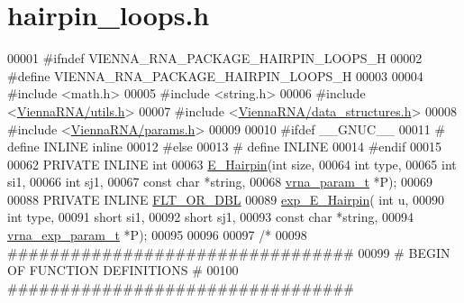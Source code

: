 \hypertarget{hairpin__loops_8h_source}{}\section{hairpin\+\_\+loops.\+h}
\label{hairpin__loops_8h_source}

\begin{DoxyCode}
00001 \textcolor{preprocessor}{#ifndef VIENNA\_RNA\_PACKAGE\_HAIRPIN\_LOOPS\_H}
00002 \textcolor{preprocessor}{#define VIENNA\_RNA\_PACKAGE\_HAIRPIN\_LOOPS\_H}
00003 
00004 \textcolor{preprocessor}{#include <math.h>}
00005 \textcolor{preprocessor}{#include <string.h>}
00006 \textcolor{preprocessor}{#include <\hyperlink{utils_8h}{ViennaRNA/utils.h}>}
00007 \textcolor{preprocessor}{#include <\hyperlink{data__structures_8h}{ViennaRNA/data\_structures.h}>}
00008 \textcolor{preprocessor}{#include <\hyperlink{params_8h}{ViennaRNA/params.h}>}
00009 
00010 \textcolor{preprocessor}{#ifdef \_\_GNUC\_\_}
00011 \textcolor{preprocessor}{# define INLINE inline}
00012 \textcolor{preprocessor}{#else}
00013 \textcolor{preprocessor}{# define INLINE}
00014 \textcolor{preprocessor}{#endif}
00015 
00062 PRIVATE INLINE \textcolor{keywordtype}{int}
00063 \hyperlink{group__loops_gadf943ee9a45b7f4cee9192c06210dace}{E\_Hairpin}(\textcolor{keywordtype}{int} size,
00064               \textcolor{keywordtype}{int} type,
00065               \textcolor{keywordtype}{int} si1,
00066               \textcolor{keywordtype}{int} sj1,
00067               \textcolor{keyword}{const} \textcolor{keywordtype}{char} *\textcolor{keywordtype}{string},
00068               \hyperlink{group__energy__parameters_structvrna__param__s}{vrna\_param\_t} *P);
00069 
00088 PRIVATE INLINE \hyperlink{group__data__structures_ga31125aeace516926bf7f251f759b6126}{FLT\_OR\_DBL}
00089 \hyperlink{group__loops_ga51fb555974f180b78d76142b2894851c}{exp\_E\_Hairpin}(  \textcolor{keywordtype}{int} u,
00090                 \textcolor{keywordtype}{int} type,
00091                 \textcolor{keywordtype}{short} si1,
00092                 \textcolor{keywordtype}{short} sj1,
00093                 \textcolor{keyword}{const} \textcolor{keywordtype}{char} *\textcolor{keywordtype}{string},
00094                 \hyperlink{group__energy__parameters_structvrna__exp__param__s}{vrna\_exp\_param\_t} *P);
00095 
00096 
00097 \textcolor{comment}{/*}
00098 \textcolor{comment}{#################################}
00099 \textcolor{comment}{# BEGIN OF FUNCTION DEFINITIONS #}
00100 \textcolor{comment}{#################################}

\end{DoxyCode}
